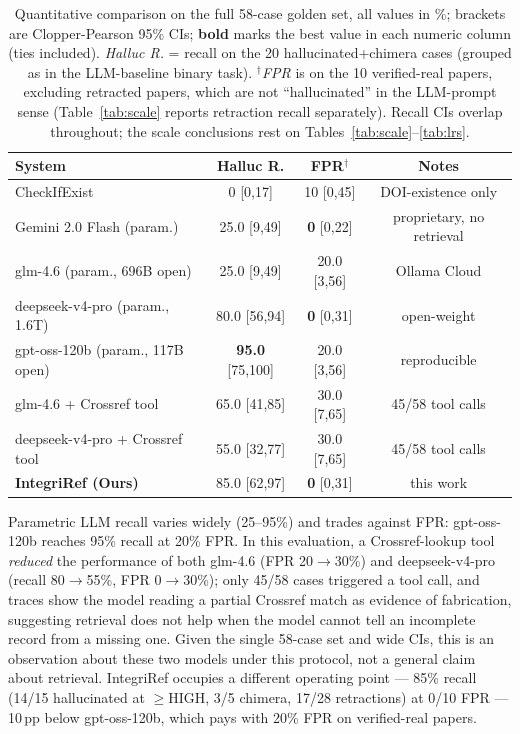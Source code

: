 \documentclass[letterpaper]{article} %
\begin{document}
\begin{table}[!tb]
\centering
\small
\setlength{\tabcolsep}{3pt}
\begin{tabular}{@{}lccc@{}}
\toprule
\textbf{System} & \textbf{Halluc R.} & \textbf{FPR$^{\dagger}$} & \textbf{Notes} \\
\midrule
CheckIfExist~\cite{abbonato2026checkifexist} & 0 \footnotesize{[0,17]} & 10 \footnotesize{[0,45]} & DOI-existence only \\
Gemini 2.0 Flash (param.) & 25.0 \footnotesize{[9,49]} & \textbf{0} \footnotesize{[0,22]} & proprietary, no retrieval \\
glm-4.6 (param., 696B open) & 25.0 \footnotesize{[9,49]} & 20.0 \footnotesize{[3,56]} & Ollama Cloud \\
deepseek-v4-pro (param., 1.6T) & 80.0 \footnotesize{[56,94]} & \textbf{0} \footnotesize{[0,31]} & open-weight \\
gpt-oss-120b (param., 117B open) & \textbf{95.0} \footnotesize{[75,100]} & 20.0 \footnotesize{[3,56]} & reproducible \\
glm-4.6 + Crossref tool & 65.0 \footnotesize{[41,85]} & 30.0 \footnotesize{[7,65]} & 45/58 tool calls \\
deepseek-v4-pro + Crossref tool & 55.0 \footnotesize{[32,77]} & 30.0 \footnotesize{[7,65]} & 45/58 tool calls \\
\midrule
\textbf{IntegriRef (Ours)} & 85.0 \footnotesize{[62,97]} & \textbf{0} \footnotesize{[0,31]} & this work \\
\bottomrule
\end{tabular}
\caption{Quantitative comparison on the full 58-case golden set, all values in \%; brackets are Clopper-Pearson 95\% CIs; \textbf{bold} marks the best value in each numeric column (ties included). \emph{Halluc R.} = recall on the 20 hallucinated+chimera cases (grouped as in the LLM-baseline binary task). $^{\dagger}$\emph{FPR} is on the 10 verified-real papers, excluding retracted papers, which are not ``hallucinated'' in the LLM-prompt sense (Table~\ref{tab:scale} reports retraction recall separately). Recall CIs overlap throughout; the scale conclusions rest on Tables~\ref{tab:scale}--\ref{tab:lrs}.}
\label{tab:results}
\end{table}

Parametric LLM recall varies widely (25--95\%) and trades against FPR: gpt-oss-120b reaches 95\% recall at 20\% FPR. In this evaluation, a Crossref-lookup tool \emph{reduced} the performance of both glm-4.6 (FPR 20$\to$30\%) and deepseek-v4-pro (recall 80$\to$55\%, FPR 0$\to$30\%); only 45/58 cases triggered a tool call, and traces show the model reading a partial Crossref match as evidence of fabrication, suggesting retrieval does not help when the model cannot tell an incomplete record from a missing one. Given the single 58-case set and wide CIs, this is an observation about these two models under this protocol, not a general claim about retrieval. IntegriRef occupies a different operating point --- 85\% recall (14/15 hallucinated at $\geq$HIGH, 3/5 chimera, 17/28 retractions) at 0/10 FPR --- 10\,pp below gpt-oss-120b, which pays with 20\% FPR on verified-real papers.
\end{document}
